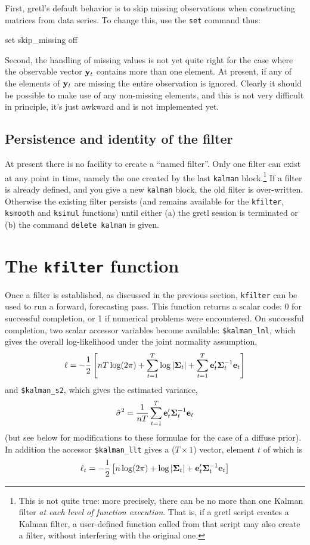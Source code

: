 First, gretl's default behavior is to skip missing observations when
constructing matrices from data series.  To change this, use the \texttt{set} 
command thus:
%
\begin{code}
set skip_missing off
\end{code}

Second, the handling of missing values is not yet quite right for the
case where the observable vector $\mathbf{y}_t$ contains more than one
element.  At present, if any of the elements of $\mathbf{y}_t$ are
missing the entire observation is ignored.  Clearly it should be
possible to make use of any non-missing elements, and this is not
very difficult in principle, it's just awkward and is not
implemented yet.

\subsection{Persistence and identity of the filter}

At present there is no facility to create a ``named filter''.  Only
one filter can exist at any point in time, namely the one created by
the last \texttt{kalman} block.\footnote{This is not quite true: more
  precisely, there can be no more than one Kalman filter \textit{at
    each level of function execution}.  That is, if a gretl script
  creates a Kalman filter, a user-defined function called from that
  script may also create a filter, without interfering with the
  original one.}  If a filter is already defined, and you give a new
\texttt{kalman} block, the old filter is over-written.  Otherwise the
existing filter persists (and remains available for the
\texttt{kfilter}, \texttt{ksmooth} and \texttt{ksimul} functions)
until either (a) the gretl session is terminated or (b) the command
\texttt{delete kalman} is given.


\section{The \texttt{kfilter} function}

Once a filter is established, as discussed in the previous section,
\texttt{kfilter} can be used to run a forward, forecasting pass.
This function returns a scalar code: 0 for successful completion, or 1
if numerical problems were encountered.  On successful completion, two
scalar accessor variables become available: \verb+$kalman_lnl+, which
gives the overall log-likelihood under the joint normality assumption,
%
\[
  \ell = -\frac{1}{2} \left[nT \log(2 \pi) + \sum_{t=1}^T\log \left|\bm{\Sigma}_t\right| + 
    \sum_{t=1}^T\mathbf{e}_t'\bm{\Sigma}_t^{-1} \mathbf{e}_t
  \right]
\]
%
and \verb+$kalman_s2+, which gives the estimated variance,
%
\[
\hat{\sigma}^2 = \frac{1}{nT} 
   \sum_{t=1}^T\mathbf{e}_t'\bm{\Sigma}_t^{-1} \mathbf{e}_t
\]
(but see below for modifications to these formulae for the case of a
diffuse prior).  In addition the accessor \verb+$kalman_llt+ gives a
($T \times 1$) vector, element $t$ of which is
%
\[
  \ell_t = -\frac{1}{2} \left[n \log(2 \pi) + \log \left|\bm{\Sigma}_t\right| + 
    \mathbf{e}_t'\bm{\Sigma}_t^{-1} \mathbf{e}_t
  \right]
\]
%

